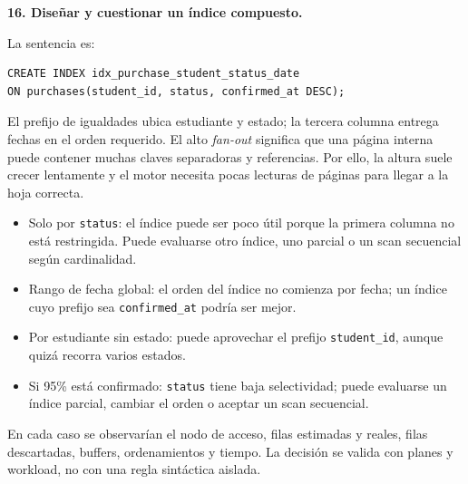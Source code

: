 \documentclass[variant=guiaresuelta,cover=institutional,mode=screen]{ua-engineering-v6-article}
\begin{document}
\begin{uaexercise}
\textbf{16. Diseñar y cuestionar un índice compuesto.}
\end{uaexercise}
\begin{uaanswer}
La sentencia es:

\begin{verbatim}
CREATE INDEX idx_purchase_student_status_date
ON purchases(student_id, status, confirmed_at DESC);
\end{verbatim}

El prefijo de igualdades ubica estudiante y estado; la tercera columna entrega fechas en el orden requerido. El alto \emph{fan-out} significa que una página interna puede contener muchas claves separadoras y referencias. Por ello, la altura suele crecer lentamente y el motor necesita pocas lecturas de páginas para llegar a la hoja correcta.

\begin{itemize}
\item Solo por \texttt{status}: el índice puede ser poco útil porque la primera columna no está restringida. Puede evaluarse otro índice, uno parcial o un scan secuencial según cardinalidad.
\item Rango de fecha global: el orden del índice no comienza por fecha; un índice cuyo prefijo sea \texttt{confirmed\_at} podría ser mejor.
\item Por estudiante sin estado: puede aprovechar el prefijo \texttt{student\_id}, aunque quizá recorra varios estados.
\item Si 95\% está confirmado: \texttt{status} tiene baja selectividad; puede evaluarse un índice parcial, cambiar el orden o aceptar un scan secuencial.
\end{itemize}

En cada caso se observarían el nodo de acceso, filas estimadas y reales, filas descartadas, buffers, ordenamientos y tiempo. La decisión se valida con planes y workload, no con una regla sintáctica aislada.
\end{uaanswer}
\end{document}
